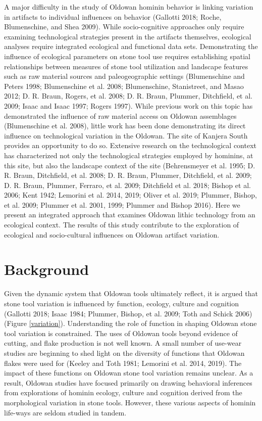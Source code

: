 \documentclass[]{elsarticle} %
\begin{document}
A major difficulty in the study of Oldowan hominin behavior is linking
variation in artifacts to individual influences on behavior (Gallotti
2018; Roche, Blumenschine, and Shea 2009). While socio-cognitive
approaches only require examining technological strategies present in
the artifacts themselves, ecological analyses require integrated
ecological and functional data sets. Demonstrating the influence of
ecological parameters on stone tool use requires establishing spatial
relationships between measures of stone tool utilization and landscape
features such as raw material sources and paleogeographic settings
(Blumenschine and Peters 1998; Blumenschine et al. 2008; Blumenschine,
Stanistreet, and Masao 2012; D. R. Braun, Rogers, et al. 2008; D. R.
Braun, Plummer, Ditchfield, et al. 2009; Isaac and Isaac 1997; Rogers
1997). While previous work on this topic has demonstrated the influence
of raw material access on Oldowan assemblages (Blumenschine et al.
2008), little work has been done demonstrating its direct influence on
technological variation in the Oldowan. The site of Kanjera South
provides an opportunity to do so. Extensive research on the
technological context has characterized not only the technological
strategies employed by hominins, at this site, but also the landscape
context of the site (Behrensmeyer et al. 1995; D. R. Braun, Ditchfield,
et al. 2008; D. R. Braun, Plummer, Ditchfield, et al. 2009; D. R. Braun,
Plummer, Ferraro, et al. 2009; Ditchfield et al. 2018; Bishop et al.
2006; Kent 1942; Lemorini et al. 2014, 2019; Oliver et al. 2019;
Plummer, Bishop, et al. 2009; Plummer et al. 2001, 1999; Plummer and
Bishop 2016). Here we present an integrated approach that examines
Oldowan lithic technology from an ecological context. The results of
this study contribute to the exploration of ecological and
socio-cultural influences on Oldowan artifact variation.

\hypertarget{background}{%
\section{Background}\label{background}}

Given the dynamic system that Oldowan tools ultimately reflect, it is
argued that stone tool variation is influenced by function, ecology,
culture and cognition (Gallotti 2018; Isaac 1984; Plummer, Bishop, et
al. 2009; Toth and Schick 2006) (Figure \ref{variation}). Understanding
the role of function in shaping Oldowan stone tool variation is
constrained. The uses of Oldowan tools beyond evidence of cutting, and
flake production is not well known. A small number of use-wear studies
are beginning to shed light on the diversity of functions that Oldowan
flakes were used for (Keeley and Toth 1981; Lemorini et al. 2014, 2019).
The impact of these functions on Oldowan stone tool variation remains
unclear. As a result, Oldowan studies have focused primarily on drawing
behavioral inferences from explorations of hominin ecology, culture and
cognition derived from the morphological variation in stone tools.
However, these various aspects of hominin life-ways are seldom studied
in tandem.
\end{document}

